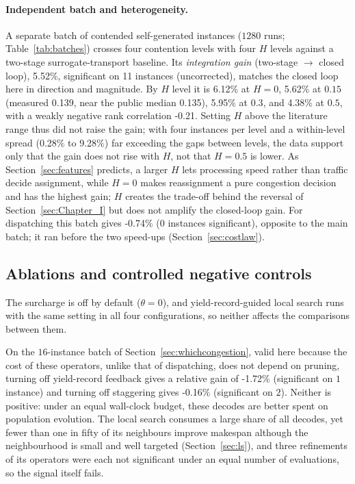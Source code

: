 \documentclass[preprint,review,12pt,authoryear]{elsarticle}
\newcommand{\MatrixCells}{16}
\newcommand{\MatrixRuns}{1280}
\newcommand{\GainIntegMatrix}{5.52\%}    %
\newcommand{\SigIntegMatrix}{11}         %
\newcommand{\GainIntegMatrixLo}{0.28\%}
\newcommand{\GainIntegMatrixHi}{9.28\%}
\newcommand{\GainProbePre}{-0.74\%}      %
\newcommand{\GainCertMatrix}{-1.72\%}    %
\newcommand{\GainStaggerMatrix}{-0.16\%} %
\newcommand{\GainIntegHZero}{6.12\%}
\newcommand{\GainIntegHLow}{5.62\%}      %
\newcommand{\GainIntegHMid}{5.95\%}      %
\newcommand{\GainIntegHHigh}{4.38\%}     %
\newcommand{\MatrixHMeasLow}{0.139}      %
\newcommand{\RhoIntegH}{-0.21}           %
\newcommand{\PubHMed}{0.135}             %
\begin{document}
\paragraph{Independent batch and heterogeneity.}
A separate batch of contended self-generated instances ($\MatrixRuns$ runs; Table~\ref{tab:batches}) crosses four contention levels with four $H$ levels against a two-stage surrogate-transport baseline.
Its \emph{integration gain} (two-stage $\to$ closed loop), \GainIntegMatrix{}, significant on \SigIntegMatrix{} instances (uncorrected), matches the closed loop here in direction and magnitude.
By $H$ level it is \GainIntegHZero{} at $H=0$, \GainIntegHLow{} at $0.15$ (measured \MatrixHMeasLow{}, near the public median \PubHMed{}), \GainIntegHMid{} at $0.3$, and \GainIntegHHigh{} at $0.5$, with a weakly negative rank correlation \RhoIntegH{}.
Setting $H$ above the literature range thus did not raise the gain; with four instances per level and a within-level spread (\GainIntegMatrixLo{} to \GainIntegMatrixHi{}) far exceeding the gaps between levels, the data support only that the gain does not rise with $H$, not that $H=0.5$ is lower.
As Section~\ref{sec:features} predicts, a larger $H$ lets processing speed rather than traffic decide assignment, while $H=0$ makes reassignment a pure congestion decision and has the highest gain; $H$ creates the trade-off behind the reversal of Section~\ref{sec:Chapter_I} but does not amplify the closed-loop gain.
For dispatching this batch gives \GainProbePre{} ($0$ instances significant), opposite to the main batch; it ran before the two speed-ups (Section~\ref{sec:costlaw}).
\subsection{Ablations and controlled negative controls}
\label{sec:pricing}

The surcharge is off by default ($\theta=0$), and yield-record-guided local search runs with the same setting in all four configurations, so neither affects the comparisons between them.

On the $\MatrixCells$-instance batch of Section~\ref{sec:whichcongestion}, valid here because the cost of these operators, unlike that of dispatching, does not depend on pruning, turning off yield-record feedback gives a relative gain of \GainCertMatrix{} (significant on $1$ instance) and turning off staggering gives \GainStaggerMatrix{} (significant on $2$). Neither is positive: under an equal wall-clock budget, these decodes are better spent on population evolution. The local search consumes a large share of all decodes, yet fewer than one in fifty of its neighbours improve makespan although the neighbourhood is small and well targeted (Section~\ref{sec:ls}), and three refinements of its operators were each not significant under an equal number of evaluations, so the signal itself fails.
\end{document}
